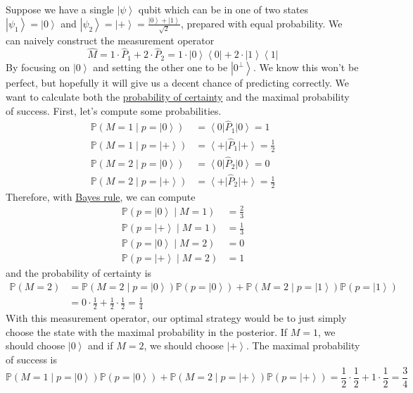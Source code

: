 \documentclass{article}
\newcommand{\ket}[1]{\ensuremath{\left|#1\right\rangle}}
\newcommand{\bra}[1]{\ensuremath{\left\langle#1\right|}}
\newcounter{example}[section]
\begin{document}
    \begin{example}
      \label{ex:distinguishing-two-non-orthonormal-states}
      Suppose we have a single $\ket{\psi}$ qubit which can be in one of two states $\ket{\psi_1} = \ket{0}$ and $\ket{\psi_2} = \ket{+} = \frac{\ket{0} + \ket{1}}{\sqrt{2}}$, prepared with equal probability. We can naively construct the measurement operator 
      \begin{equation}
        \hat{M} = 1 \cdot \hat{P}_1 + 2 \cdot \hat{P}_2 = 1 \cdot \ket{0} \bra{0} + 2 \cdot \ket{1} \bra{1}
      \end{equation} 
      By focusing on $\ket{0}$ and setting the other one to be $\ket{0^\perp}$. We know this won't be perfect, but hopefully it will give us a decent chance of predicting correctly. We want to calculate both the \hyperref[def:probability-of-certainty]{probability of certainty} and the maximal probability of success. First, let's compute some probabilities. 
      \begin{align}
        \mathbb{P}(M = 1 \mid p = \ket{0}) & = \bra{0} \hat{P}_1 \ket{0} = 1 \\ 
        \mathbb{P}(M = 1 \mid p = \ket{+}) & = \bra{+} \hat{P}_1 \ket{+} = \frac{1}{2} \\ 
        \mathbb{P}(M = 2 \mid p = \ket{0}) & = \bra{0} \hat{P}_2 \ket{0} = 0 \\ 
        \mathbb{P}(M = 2 \mid p = \ket{+}) & = \bra{+} \hat{P}_2 \ket{+} = \frac{1}{2} 
      \end{align}
      Therefore, with \hyperref[prob-thm:bayes-rule]{Bayes rule}, we can compute 
      \begin{align}
        \mathbb{P}(p = \ket{0} \mid M = 1) & = \frac{2}{3} \\ 
        \mathbb{P}(p = \ket{+} \mid M = 1) & = \frac{1}{3} \\ 
        \mathbb{P}(p = \ket{0} \mid M = 2) & = 0 \\ 
        \mathbb{P}(p = \ket{+} \mid M = 2) & = 1
      \end{align}
      and the probability of certainty is 
      \begin{align}
        \mathbb{P}(M = 2) & = \mathbb{P}(M = 2 \mid p = \ket{0}) \mathbb{P}(p = \ket{0}) + \mathbb{P}(M = 2 \mid p = \ket{1}) \mathbb{P}(p = \ket{1}) \\
                          & = 0 \cdot \frac{1}{2} + \frac{1}{2} \cdot \frac{1}{2} = \frac{1}{4}
      \end{align}
      With this measurement operator, our optimal strategy would be to just simply choose the state with the maximal probability in the posterior. If $M = 1$, we should choose $\ket{0}$ and if $M = 2$, we should choose $\ket{+}$. The maximal probability of success is 
      \begin{equation}
        \mathbb{P}(M = 1 \mid p = \ket{0}) \mathbb{P}(p = \ket{0}) + \mathbb{P}(M = 2 \mid p = \ket{+}) \mathbb{P}(p = \ket{+}) = \frac{1}{2} \cdot \frac{1}{2} + 1 \cdot \frac{1}{2} = \frac{3}{4}
      \end{equation}
    \end{example}
\end{document}
